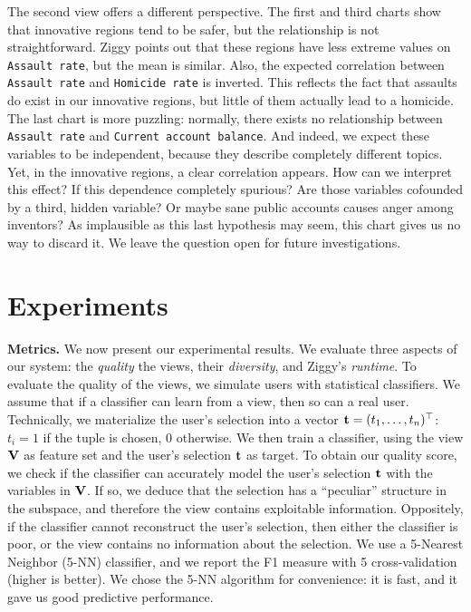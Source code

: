 The second view offers a different perspective. The first and third charts show
that innovative regions tend to be safer, but the relationship is not
straightforward. Ziggy points out that these regions have less extreme values
on \texttt{Assault rate}, but the mean is similar. Also, the expected
correlation between \texttt{Assault rate} and \texttt{Homicide rate} is
inverted. This reflects the fact that assaults do exist in our innovative
regions, but little of them actually lead to a homicide. The last chart is more
puzzling: normally, there exists no relationship between \texttt{Assault rate}
and \texttt{Current ac\-count balance}. And indeed, we expect these variables
to be independent, because they describe completely different topics. Yet,
in the innovative regions, a clear correlation appears. How can we interpret
this effect? If this dependence completely spurious? Are those
variables cofounded by a third, hidden variable? Or maybe sane public accounts
causes anger among inventors? As implausible as this last hypothesis may seem, this
chart gives us no way to discard it. We leave the question open for future
investigations.

\section{Experiments}
\label{sec:experiments}

\textbf{Metrics.} We now present our experimental results. We evaluate
three aspects of our system: the \emph{quality} the views, their
\emph{diversity}, and Ziggy's \emph{runtime}. To evaluate the quality of the
views, we simulate users with statistical classifiers. We assume that if a
classifier can learn from a view, then so can a real user. Technically, we
materialize the user's selection into a vector $\mathbf{t} = (t_1, \ldots,
t_n)^\top$: $t_i=1$ if the tuple is chosen, 0 otherwise.  We then train a
classifier, using the view $\bf{V}$ as feature set and the user's selection
$\bf{t}$ as target. To obtain our quality score, 
we check if the classifier can accurately model the user's selection $\mathbf{t}$ with the
variables in $\bf{V}$. If so, we deduce that the selection has a
``peculiar'' structure in the subspace, and therefore the view contains
exploitable information. Oppositely, if the classifier cannot reconstruct the
user's selection, then either the classifier is poor, or the view contains no
information about the selection. We use a 5-Nearest Neighbor (5-NN) classifier,
and we report the F1 measure with 5 cross-validation (higher is better). We
chose the 5-NN algorithm for convenience: it is fast, and it gave
us good predictive performance. 

